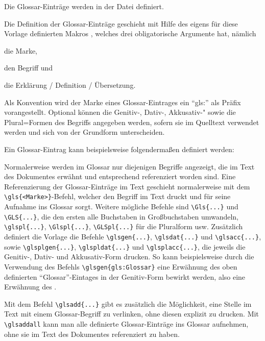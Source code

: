 Die Glossar-Einträge werden in der Datei   definiert.

Die Definition der Glossar-Einträge geschieht mit Hilfe des eigens für diese Vorlage definierten Makros ,
welches drei obligatorische Argumente hat, nämlich
\begin{itemize*}
\item die Marke,
\item den Begriff und
\item die Erklärung / Definition / Übersetzung.
\end{itemize*}
Als Konvention wird der Marke eines Glossar-Eintrages ein \enquote{gls:} als Präfix vorangestellt.
Optional können die Genitiv-, Dativ-, Akkusativ-" sowie die Plural=Formen des Begriffs angegeben werden,
sofern sie im Quelltext verwendet werden und sich von der Grundform unterscheiden.

Ein Glossar-Eintrag kann beispielsweise folgendermaßen definiert werden:
\begin{latex}[caption={Definition eines Glossar-Eintrages},label={lst:GlossEntry}]
\end{latex}

Normalerweise werden im Glossar nur diejenigen Begriffe angezeigt,
die im Text des Dokumentes erwähnt und entsprechend referenziert worden sind.
Eine Referenzierung der Glossar-Einträge im Text geschieht normalerweise mit dem
\lstinline|\gls{<Marke>}|-Befehl,
welcher den Begriff im Text druckt und für seine Aufnahme ins Glossar sorgt.
Weitere mögliche Befehle sind \lstinline|\Gls{...}| und \lstinline|\GLS{...}|,
die den ersten \bzw alle Buchstaben in Großbuchstaben umwandeln,
\lstinline|\glspl{...}|, \lstinline|\Glspl{...}|, \lstinline|\GLSpl{...}|
für die Pluralform usw.
Zusätzlich definiert die Vorlage die Befehle
\lstinline|\glsgen{...}|, \lstinline|\glsdat{...}| und \lstinline|\glsacc{...}|,
sowie
\lstinline|\glsplgen{...}|, \lstinline|\glspldat{...}| und \lstinline|\glsplacc{...}|,
die jeweils die Genitiv-, Dativ- und Akkusativ-Form drucken.
So kann beispielsweise durch die Verwendung des Befehls 
\lstinline|\glsgen{gls:Glossar}| eine Erwähnung des oben definierten \enquote{Glossar}-Eintages
in der Genitiv-Form bewirkt werden, also eine Erwähnung des .

Mit dem Befehl \lstinline|\glsadd{...}| gibt es zusätzlich die Möglichkeit,
eine Stelle im Text mit einem Glossar-Begriff zu verlinken, ohne diesen explizit zu drucken.
Mit \lstinline|\glsaddall| kann man alle definierte Glossar-Einträge ins Glossar aufnehmen,
ohne sie im Text des Dokumentes referenziert zu haben.

